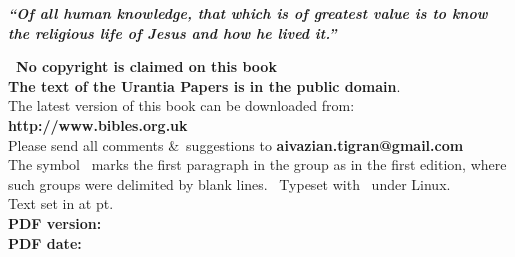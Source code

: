 \newpage


\begin{center}
\begin{center}\parbox{7cm}{\bfseries\itshape ``Of all human knowledge, that which is of greatest value is to know the religious life of Jesus and how he lived it.'' }\end{center}
\parbox{0.9\linewidth}{\centering
\textbf{\upshape\nocopyright\ No copyright is claimed on this book\\
The text of the Urantia Papers is in the public domain}.\\[5pt]
The latest version of this book can be downloaded from:\\
{\upshape\bfseries http://www.bibles.org.uk}\\
Please send all comments \&\ suggestions to {\makeatletter\upshape\bfseries aivazian.tigran@gmail.com\makeatother}\\
The symbol \pc\ marks the first paragraph in the group as in the first edition, where such groups were delimited by blank lines.
\tux\ Typeset with \XeLaTeX\ under Linux.\\
Text set in \textbf{\urantiamainfont} at \urantiamainfontsize pt.\\[18pt]
\upshape\small\bfseries PDF version: \\
\upshape\small\bfseries PDF date: \mytoday{}\\
}
\end{center}

